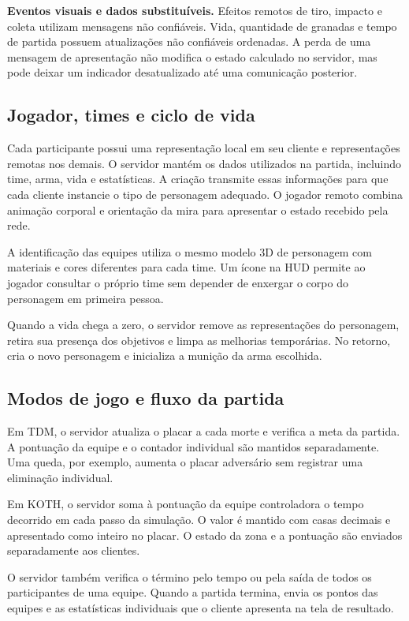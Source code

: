 \textbf{Eventos visuais e dados substituíveis.} Efeitos remotos de tiro, impacto e coleta utilizam mensagens não confiáveis. Vida, quantidade de granadas e tempo de partida possuem atualizações não confiáveis ordenadas. A perda de uma mensagem de apresentação não modifica o estado calculado no servidor, mas pode deixar um indicador desatualizado até uma comunicação posterior.



\subsection{Jogador, times e ciclo de vida}\label{sec:5.2.5}

Cada participante possui uma representação local em seu cliente e representações remotas nos demais. O servidor mantém os dados utilizados na partida, incluindo time, arma, vida e estatísticas. A criação transmite essas informações para que cada cliente instancie o tipo de personagem adequado. O jogador remoto combina animação corporal e orientação da mira para apresentar o estado recebido pela rede.

A identificação das equipes utiliza o mesmo modelo 3D de personagem com materiais e cores diferentes para cada time. Um ícone na HUD permite ao jogador consultar o próprio time sem depender de enxergar o corpo do personagem em primeira pessoa.

Quando a vida chega a zero, o servidor remove as representações do personagem, retira sua presença dos objetivos e limpa as melhorias temporárias. No retorno, cria o novo personagem e inicializa a munição da arma escolhida.

\subsection{Modos de jogo e fluxo da partida}\label{sec:5.2.6}

Em TDM, o servidor atualiza o placar a cada morte e verifica a meta da partida. A pontuação da equipe e o contador individual são mantidos separadamente. Uma queda, por exemplo, aumenta o placar adversário sem registrar uma eliminação individual.

Em KOTH, o servidor soma à pontuação da equipe controladora o tempo decorrido em cada passo da simulação. O valor é mantido com casas decimais e apresentado como inteiro no placar. O estado da zona e a pontuação são enviados separadamente aos clientes.

O servidor também verifica o término pelo tempo ou pela saída de todos os participantes de uma equipe. Quando a partida termina, envia os pontos das equipes e as estatísticas individuais que o cliente apresenta na tela de resultado.


